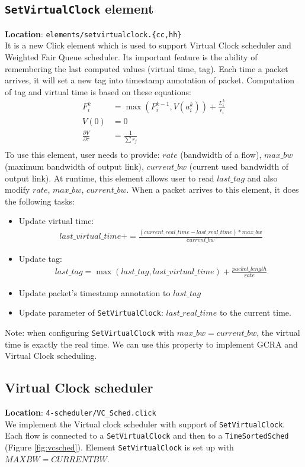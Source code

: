 \documentclass[a4paper]{article}
\begin{document}
  \subsection{\texttt{SetVirtualClock} element} \label{section:virtualclock}
  \textbf{Location}: \texttt{elements/setvirtualclock.\{cc,hh\}}\\
  It is a new Click element which is used to support Virtual Clock scheduler and Weighted Fair Queue scheduler. Its important feature is the ability of remembering the last computed values (virtual time, tag). Each time a packet arrives, it will set a new tag into timestamp annotation of packet. Computation of tag and virtual time is based on these equations: \\ 
  \begin{align*}
  F_{i}^{k} &= \max(F_{i}^{k-1}, V(a_{i}^{k})) + \frac{L_{i}^{k}}{r_i}\\
  V(0) &= 0 \\
  \frac{\partial V}{\partial \tau} &= \frac{1}{\sum r_j} \\
  \end{align*}
  To use this element, user needs to provide: $rate$ (bandwidth of a flow), $max\_bw$ (maximum bandwidth of output link), $current\_bw$ (current used bandwidth of output link). At runtime, this element allows user to read $last\_tag$ and also modify $rate$, $max\_bw$, $current\_bw$. When a packet arrives to this element, it does the following tasks:
  \begin{itemize}
  	\item Update virtual time: 
  	\begin{align*}last\_virtual\_time += \frac{(current\_real\_time - last\_real\_time)*max\_bw}{current\_bw}\end{align*}
  	\item Update tag:
  	\begin{align*}last\_tag = \max(last\_tag, last\_virtual\_time) + \frac{packet\_length}{rate}\end{align*}
  	\item Update packet's timestamp annotation to $last\_tag$
  	\item Update parameter of \texttt{SetVirtualClock}: $last\_real\_time$ to the current time.  	
  \end{itemize}
  Note: when configuring \texttt{SetVirtualClock} with $max\_bw = current\_bw$, the virtual time is exactly the real time. We can use this property to implement GCRA and Virtual Clock scheduling.
  \subsection{Virtual Clock scheduler}
  \textbf{Location}: \texttt{4-scheduler/VC\_Sched.click}\\
  We implement the Virtual clock scheduler with support of \texttt{SetVirtualClock}. Each flow is connected to a \texttt{SetVirtualClock} and then to a \texttt{TimeSortedSched} (Figure \ref{fig:vcsched}). Element \texttt{SetVirtualClock} is set up with $MAXBW = CURRENTBW$.  
\end{document}

